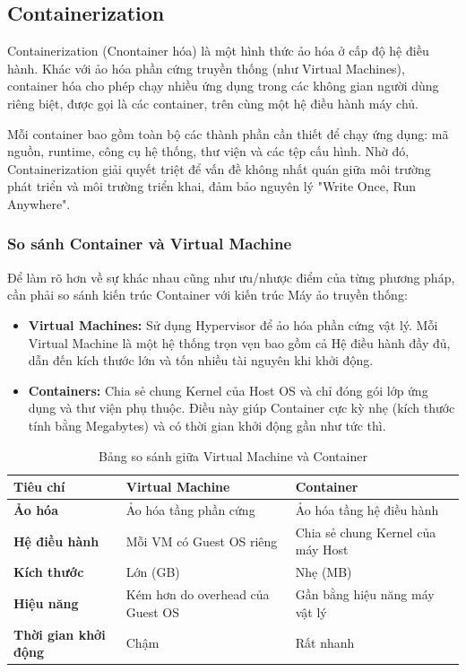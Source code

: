 \subsection{Containerization}

Containerization (Cnontainer hóa) là một hình thức ảo hóa ở cấp độ hệ điều hành. Khác với ảo hóa phần cứng truyền thống (như Virtual Machines), container hóa cho phép chạy nhiều ứng dụng trong các không gian người dùng riêng biệt, được gọi là các container, trên cùng một hệ điều hành máy chủ.

Mỗi container bao gồm toàn bộ các thành phần cần thiết để chạy ứng dụng: mã nguồn, runtime, công cụ hệ thống, thư viện và các tệp cấu hình. Nhờ đó, Containerization giải quyết triệt để vấn đề không nhất quán giữa môi trường phát triển và môi trường triển khai, đảm bảo nguyên lý "Write Once, Run Anywhere".

\subsubsection{So sánh Container và Virtual Machine}
Để làm rõ hơn về sự khác nhau cũng như ưu/nhược điểm của từng phương pháp, cần phải so sánh kiến trúc Container với kiến trúc Máy ảo truyền thống:

\begin{itemize}
    \item \textbf{Virtual Machines:} Sử dụng Hypervisor để ảo hóa phần cứng vật lý. Mỗi Virtual Machine là một hệ thống trọn vẹn bao gồm cả Hệ điều hành đầy đủ, dẫn đến kích thước lớn và tốn nhiều tài nguyên khi khởi động.
    \item \textbf{Containers:} Chia sẻ chung Kernel của Host OS và chỉ đóng gói lớp ứng dụng và thư viện phụ thuộc. Điều này giúp Container cực kỳ nhẹ (kích thước tính bằng Megabytes) và có thời gian khởi động gần như tức thì.
\end{itemize}

\begin{table}[h]
\centering
\caption{Bảng so sánh giữa Virtual Machine và Container}
\label{tab:vm_vs_container}
\begin{tabular}{|p{4cm}|p{5cm}|p{5cm}|}
\hline
\textbf{Tiêu chí} & \textbf{Virtual Machine} & \textbf{Container} \\
\hline
\textbf{Ảo hóa} & Ảo hóa tầng phần cứng & Ảo hóa tầng hệ điều hành \\
\hline
\textbf{Hệ điều hành} & Mỗi VM có Guest OS riêng & Chia sẻ chung Kernel của máy Host \\
\hline
\textbf{Kích thước} & Lớn (GB) & Nhẹ (MB) \\
\hline
\textbf{Hiệu năng} & Kém hơn do overhead của Guest OS & Gần bằng hiệu năng máy vật lý \\
\hline
\textbf{Thời gian khởi động} & Chậm & Rất nhanh \\
\hline
\end{tabular}
\end{table}

